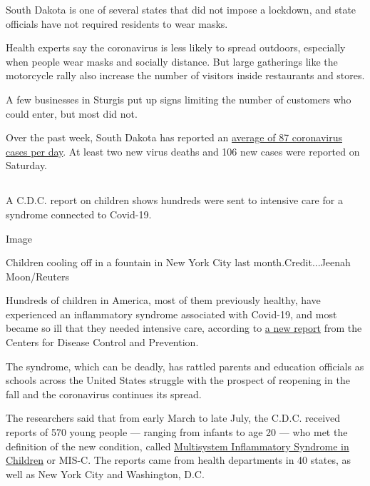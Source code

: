 South Dakota is one of several states that did not impose a lockdown,
and state officials have not required residents to wear masks.

Health experts say the coronavirus is less likely to spread outdoors,
especially when people wear masks and socially distance. But large
gatherings like the motorcycle rally also increase the number of
visitors inside restaurants and stores.

A few businesses in Sturgis put up signs limiting the number of
customers who could enter, but most did not.

Over the past week, South Dakota has reported an
\href{https://www.nytimes.com/interactive/2020/us/south-dakota-coronavirus-cases.html}{average
of 87 coronavirus cases per day}. At least two new virus deaths and 106
new cases were reported on Saturday.

\hypertarget{section-3}{%
\subsection{}\label{section-3}}

A C.D.C. report on children shows hundreds were sent to intensive care
for a syndrome connected to Covid-19.

Image

Children cooling off in a fountain in New York City last
month.Credit...Jeenah Moon/Reuters

Hundreds of children in America, most of them previously healthy, have
experienced an inflammatory syndrome associated with Covid-19, and most
became so ill that they needed intensive care, according to
\href{https://www.cdc.gov/mmwr/volumes/69/wr/mm6932e2.htm?s_cid=mm6932e2_w\#T1_down}{a
new report} from the Centers for Disease Control and Prevention.

The syndrome, which can be deadly, has rattled parents and education
officials as schools across the United States struggle with the prospect
of reopening in the fall and the coronavirus continues its spread.

The researchers said that from early March to late July, the C.D.C.
received reports of 570 young people --- ranging from infants to age 20
--- who met the definition of the new condition, called
\href{https://www.nytimes.com/2020/05/17/health/coronavirus-multisystem-fnflammatory-syndrome-children-teenagers.html}{Multisystem
Inflammatory Syndrome in Children} or MIS-C. The reports came from
health departments in 40 states, as well as New York City and
Washington, D.C.

